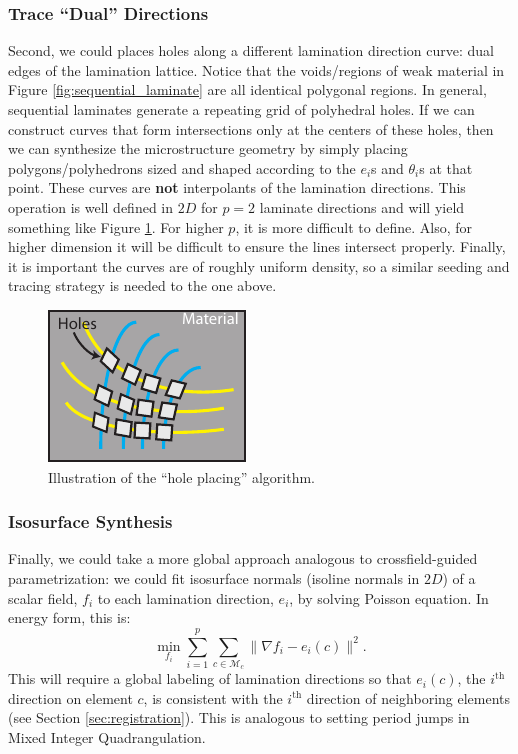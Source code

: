\documentclass[10pt]{article}
\providecommand{\norm}[1]{\lVert#1\rVert}
\providecommand{\mesh}{\mathcal{M}}
\begin{document}
\subsubsection{Trace ``Dual'' Directions}
\label{sec:dual_trace}
Second, we could places holes along a different lamination direction curve: dual
edges of the lamination lattice. Notice that the voids/regions of weak material
in Figure \ref{fig:sequential_laminate} are all identical polygonal regions. In
general, sequential laminates generate a repeating grid of polyhedral holes. If
we can construct curves that form intersections only at the centers of
these holes, then we can synthesize the microstructure geometry by simply placing
polygons/polyhedrons sized and shaped according to the $e_i$s and $\theta_i$s at
that point. These curves are \textbf{not} interpolants of the lamination
directions. This operation is well defined in $2D$ for $p = 2$ laminate
directions and will yield something like Figure \ref{fig:hole_place}. For higher
$p$, it is more difficult to define. Also, for higher dimension it will be
difficult to ensure the lines intersect properly. Finally, it is important the
curves are of roughly uniform density, so a similar seeding and tracing strategy
is needed to the one above.

\begin{figure}[h!]
    \centering
\includegraphics[height=0.3\textwidth]{images/hole_packing}
\caption{Illustration of the ``hole placing'' algorithm.}
\label{fig:hole_place}
\end{figure}

\subsubsection{Isosurface Synthesis}
\label{sec:isosurface}
Finally, we could take a more global approach analogous to crossfield-guided
parametrization: we could fit isosurface normals (isoline normals in
$2D$) of a scalar field, $f_i$ to each lamination direction, $e_i$, by solving
Poisson equation. In energy form, this is:
$$
\min_{f_i} \sum_{i=1}^p \sum_{c \in \mesh_c} \norm{\nabla f_i - e_i(c)}^2.
$$
This will require a global labeling of lamination directions so that $e_i(c)$, the
$i^\text{th}$ direction on element $c$, is consistent with the $i^\text{th}$
direction of neighboring elements (see Section \ref{sec:registration}). This is
analogous to setting period jumps in Mixed Integer Quadrangulation.
\end{document}
